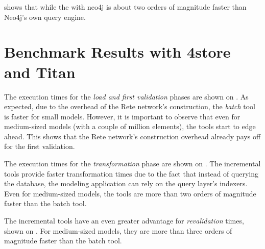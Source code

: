
 shows that while the \iqd{} with neo4j is about two orders of magnitude faster than Neo4j's own query engine.



\section{Benchmark Results with 4store and Titan}
\label{evaluation-results}



The execution times for the \emph{load and first validation} phases are shown on .
As expected, due to the overhead of the Rete network's construction, the \emph{batch} tool is faster for small models. However, it is important to observe that even for medium-sized models (with a couple of million elements), the \iqd{} tools start to edge ahead. This shows that the Rete network's construction overhead already pays off for the first validation.


The execution times for the \emph{transformation} phase are shown on . The incremental tools provide faster transformation times due to the fact that instead of querying the database, the modeling application can rely on the query layer's indexers. Even for medium-sized models, the \iqd{} tools are more than two orders of magnitude faster than the batch tool.


The incremental tools have an even greater advantage for \emph{revalidation} times, shown on . For medium-sized models, they are more than three orders of magnitude faster than the batch tool.

